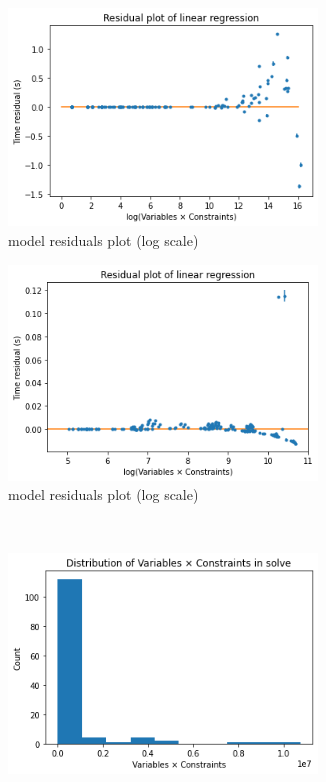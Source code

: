 \begin{figure}
\begin{subfigure}{0.475\textwidth}
\includegraphics[width=0.9\textwidth]{images/residuals-solve.png}
\caption{\solve model residuals plot (log scale)}
\label{fig:stats:residuals-solve}
\end{subfigure}
\hfill
\begin{subfigure}{0.475\textwidth}
\includegraphics[width=0.9\textwidth]{images/residuals-RecCheck.png}
\caption{\RecCheck model residuals plot (log scale)}
\label{fig:stats:residuals-reccheck}
\end{subfigure}
\\[3ex]
\begin{subfigure}{0.475\textwidth}
\includegraphics[width=0.9\textwidth]{images/distribution-solve.png}

\end{subfigure}
\end{figure}

